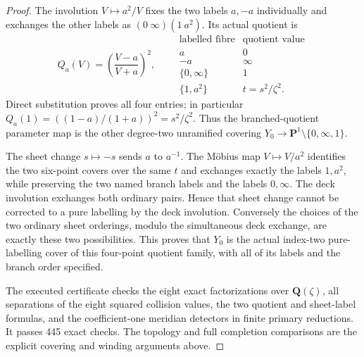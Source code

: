 \begin{proof}
The involution $V\mapsto a^2/V$ fixes the two labels
$a,-a$ individually and exchanges the other labels
as $(0\ \infty)(1\ a^2)$.
Its actual quotient is
\[
 Q_a(V)=\left(\frac{V-a}{V+a}\right)^2,
 \qquad
 \begin{array}{c|c}
 \text{labelled fibre}&\text{quotient value}\\ \hline
 a&0\\
 -a&\infty\\
 \{0,\infty\}&1\\
 \{1,a^2\}&t=s^2/\zeta^2 .
 \end{array}                                                    \tag{F.17.12}
\]
Direct substitution proves all four entries;
in particular
$Q_a(1)=((1-a)/(1+a))^2=s^2/\zeta^2$.
Thus the branched-quotient parameter map is the
other degree-two unramified covering
$Y_0\to\mathbf P^1\setminus\{0,\infty,1\}$.

The sheet change $s\mapsto-s$ sends $a$ to $a^{-1}$.
The M\"obius map $V\mapsto V/a^2$ identifies the
two six-point covers over the same $t$ and exchanges
exactly the labels $1,a^2$, while preserving the
two named branch labels and the labels $0,\infty$.
The deck involution exchanges both ordinary pairs.
Hence that sheet change cannot be corrected to a
pure labelling by the deck involution.
Conversely the choices of the two ordinary
sheet orderings, modulo the simultaneous deck
exchange, are exactly these two possibilities.
This proves that $Y_0$ is the actual index-two
pure-labelling cover of this four-point quotient
family, with all of its labels and the branch order
specified.

The executed certificate
checks the eight exact factorizations over
$\mathbf Q(\zeta)$, all separations of the eight
squared collision values, the two quotient and
sheet-label formulas, and the coefficient-one
meridian detectors in finite primary reductions.
It passes 445 exact checks.
The topology and full completion comparisons are
the explicit covering and winding arguments above.
\end{proof}
